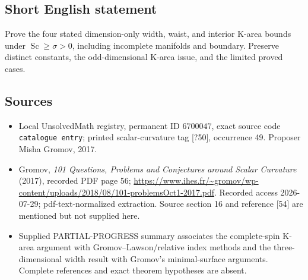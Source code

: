 \documentclass[11pt]{article}
\begin{document}
\subsection{Short English statement}
Prove the four stated dimension-only width, waist, and interior K-area bounds under \(\operatorname{Sc}\ge\sigma>0\), including incomplete manifolds and boundary. Preserve distinct constants, the odd-dimensional K-area issue, and the limited proved cases.
\subsection{Sources}
\begin{itemize}
\item Local UnsolvedMath registry, permanent ID \(6700047\), exact source code \texttt{catalogue entry}; printed scalar-curvature tag [?50], occurrence 49. Proposer Misha Gromov, 2017.
\item Gromov, \emph{101 Questions, Problems and Conjectures around Scalar Curvature} (2017), recorded PDF page 56; \url{https://www.ihes.fr/~gromov/wp-content/uploads/2018/08/101-problemsOct1-2017.pdf}. Recorded access 2026-07-29; pdf-text-normalized extraction. Source section 16 and reference [54] are mentioned but not supplied here.
\item Supplied PARTIAL-PROGRESS summary associates the complete-spin K-area argument with Gromov--Lawson/relative index methods and the three-dimensional width result with Gromov's minimal-surface arguments. Complete references and exact theorem hypotheses are absent.
\end{itemize}
\end{document}
